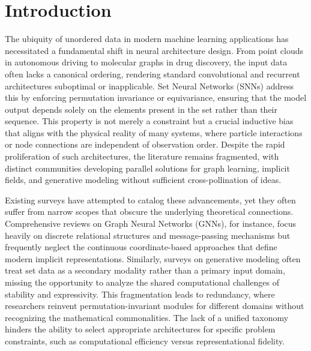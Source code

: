 \documentclass{article}
\begin{document}
\section{Introduction}

\label{sec:introduction}

The ubiquity of unordered data in modern machine learning applications has necessitated a fundamental shift in neural architecture design. From point clouds in autonomous driving to molecular graphs in drug discovery, the input data often lacks a canonical ordering, rendering standard convolutional and recurrent architectures suboptimal or inapplicable. Set Neural Networks (SNNs) address this by enforcing permutation invariance or equivariance, ensuring that the model output depends solely on the elements present in the set rather than their sequence. This property is not merely a constraint but a crucial inductive bias that aligns with the physical reality of many systems, where particle interactions or node connections are independent of observation order. Despite the rapid proliferation of such architectures, the literature remains fragmented, with distinct communities developing parallel solutions for graph learning, implicit fields, and generative modeling without sufficient cross-pollination of ideas.

Existing surveys have attempted to catalog these advancements, yet they often suffer from narrow scopes that obscure the underlying theoretical connections. Comprehensive reviews on Graph Neural Networks (GNNs), for instance, focus heavily on discrete relational structures and message-passing mechanisms but frequently neglect the continuous coordinate-based approaches that define modern implicit representations. Similarly, surveys on generative modeling often treat set data as a secondary modality rather than a primary input domain, missing the opportunity to analyze the shared computational challenges of stability and expressivity. This fragmentation leads to redundancy, where researchers reinvent permutation-invariant modules for different domains without recognizing the mathematical commonalities. The lack of a unified taxonomy hinders the ability to select appropriate architectures for specific problem constraints, such as computational efficiency versus representational fidelity.
\end{document}
